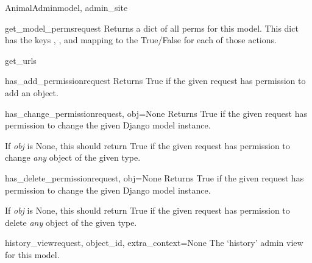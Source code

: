 \documentclass[letterpaper,10pt,english]{sphinxmanual}
\begin{document}
\begin{classdesc}{AnimalAdmin}{model, admin\_site}
\hypertarget{animal.admin.AnimalAdmin.get_model_perms}{}\begin{methoddesc}{get\_model\_perms}{request}
Returns a dict of all perms for this model. This dict has the keys
, , and  mapping to the True/False for each
of those actions.
\end{methoddesc}

\hypertarget{animal.admin.AnimalAdmin.get_urls}{}\begin{methoddesc}{get\_urls}{}\end{methoddesc}

\hypertarget{animal.admin.AnimalAdmin.has_add_permission}{}\begin{methoddesc}{has\_add\_permission}{request}
Returns True if the given request has permission to add an object.
\end{methoddesc}

\hypertarget{animal.admin.AnimalAdmin.has_change_permission}{}\begin{methoddesc}{has\_change\_permission}{request, obj=None}
Returns True if the given request has permission to change the given
Django model instance.

If \emph{obj} is None, this should return True if the given request has
permission to change \emph{any} object of the given type.
\end{methoddesc}

\hypertarget{animal.admin.AnimalAdmin.has_delete_permission}{}\begin{methoddesc}{has\_delete\_permission}{request, obj=None}
Returns True if the given request has permission to change the given
Django model instance.

If \emph{obj} is None, this should return True if the given request has
permission to delete \emph{any} object of the given type.
\end{methoddesc}

\hypertarget{animal.admin.AnimalAdmin.history_view}{}\begin{methoddesc}{history\_view}{request, object\_id, extra\_context=None}
The `history' admin view for this model.
\end{methoddesc}


\end{classdesc}
\end{document}

